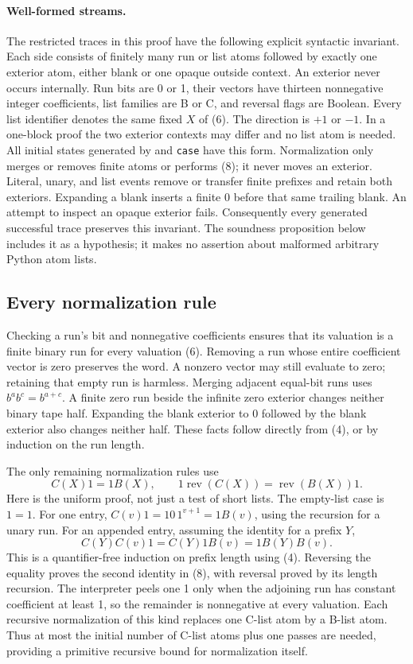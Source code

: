 \documentclass[11pt]{article}
\newcommand{\rev}{\operatorname{rev}}
\begin{document}
\paragraph{Well-formed streams.}
The restricted traces in this proof have the following explicit syntactic
invariant.  Each side consists of finitely many run or list atoms followed
by exactly one exterior atom, either blank or one opaque outside context.
An exterior never occurs internally.  Run bits are 0 or 1, their vectors
have thirteen nonnegative integer coefficients, list families are B or C,
and reversal flags are Boolean.  Every list identifier denotes the same
fixed $X$ of (6).  The direction is $+1$ or $-1$.  In a one-block proof
the two exterior contexts may differ and no list atom is needed.
All initial states generated by  and
\texttt{case} have this form.  Normalization only merges or removes
finite atoms or performs (8); it never moves an exterior.  Literal,
unary, and list events remove or transfer finite prefixes and retain
both exteriors.  Expanding a blank inserts a finite 0 before that same
trailing blank.  An attempt to inspect an opaque exterior fails.
Consequently every generated successful trace preserves this invariant.
The soundness proposition below includes it as a hypothesis; it makes
no assertion about malformed arbitrary Python atom lists.

\subsection{Every normalization rule}

Checking a run's bit and nonnegative coefficients ensures that its
valuation is a finite binary run for every valuation (6).  Removing a run
whose entire coefficient vector is zero preserves the word.  A nonzero
vector may still evaluate to zero; retaining that empty run is harmless.
Merging adjacent equal-bit runs uses $b^a b^c=b^{a+c}$.  A finite zero run
beside the infinite zero exterior changes neither binary tape half.
Expanding the blank exterior to $0$ followed by the blank exterior also
changes neither half.  These facts follow directly from (4), or by
induction on the run length.

The only remaining normalization rules use
\[
 C(X)1=1B(X),\qquad 1\rev(C(X))=\rev(B(X))1.                     \tag{8}
\]
Here is the uniform proof, not just a test of short lists.  The empty-list
case is $1=1$.  For one entry,
$C(v)1=10\,1^{v+1}=1B(v)$, using the recursion for a unary run.  For an
appended entry, assuming the identity for a prefix $Y$,
\[
 C(Y)C(v)1=C(Y)1B(v)=1B(Y)B(v).
\]
This is a quantifier-free induction on prefix length using (4).  Reversing
the equality proves the second identity in (8), with reversal proved by
its length recursion.  The interpreter peels one 1 only when the adjoining
run has constant coefficient at least 1, so the remainder is nonnegative
at every valuation.  Each recursive normalization of this kind replaces
one C-list atom by a B-list atom.  Thus at most the initial number of
C-list atoms plus one passes are needed, providing a primitive recursive
bound for normalization itself.
\end{document}
